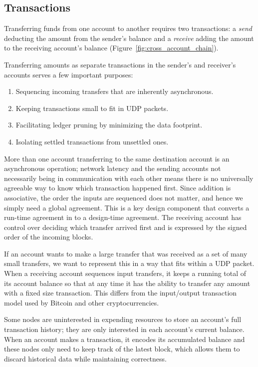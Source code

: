 \subsection{Transactions} \label{sec:transactions}
Transferring funds from one account to another requires two transactions: a \textit{send} deducting the amount from the sender's balance and a \textit{receive} adding the amount to the receiving account's balance (Figure~\ref{fig:cross_account_chain}).

Transferring amounts as separate transactions in the sender's and receiver's accounts serves a few important purposes:
\begin{enumerate}
   \item Sequencing incoming transfers that are inherently asynchronous.
   \item Keeping transactions small to fit in UDP packets.
   \item Facilitating ledger pruning by minimizing the data footprint.
   \item Isolating settled transactions from unsettled ones.
\end{enumerate}

More than one account transferring to the same destination account is an asynchronous operation; network latency and the sending accounts not necessarily being in communication with each other means there is no universally agreeable way to know which transaction happened first. Since addition is associative, the order the inputs are sequenced does not matter, and hence we simply need a global agreement. This is a key design component that converts a run-time agreement in to a design-time agreement. The receiving account has control over deciding which transfer arrived first and is expressed by the signed order of the incoming blocks.

If an account wants to make a large transfer that was received as a set of many small transfers, we want to represent this in a way that fits within a UDP packet. When a receiving account sequences input transfers, it keeps a running total of its account balance so that at any time it has the ability to transfer any amount with a fixed size transaction. This differs from the input/output transaction model used by Bitcoin and other cryptocurrencies.

Some nodes are uninterested in expending resources to store an account's full transaction history; they are only interested in each account's current balance. When an account makes a transaction, it encodes its accumulated balance and these nodes only need to keep track of the latest block, which allows them to discard historical data while maintaining correctness.

